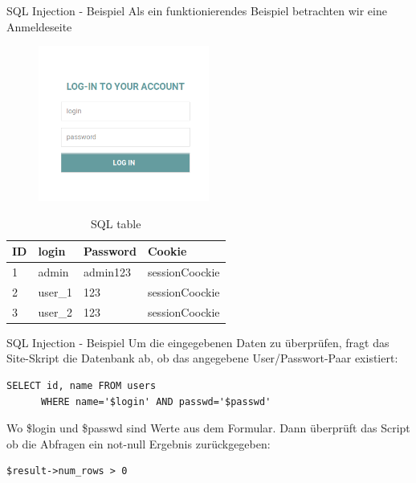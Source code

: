 \documentclass[10pt]{beamer}
\begin{document}
\begin{frame}[fragile]{SQL Injection - Beispiel}
  Als ein funktionierendes Beispiel betrachten wir eine Anmeldeseite
  \newline
  \newline
  \newline
  \begin{minipage}{0.49\textwidth}
    \centering
    \begin{figure}[h]
      \centering
      \includegraphics[width=0.5\textwidth]{sql_ex_1}
    \end{figure}
  \end{minipage}
  \begin{minipage}{0.49\textwidth}
    \centering
    \begin{table}[]
    \scriptsize
    \centering
      \begin{table}[]
        \centering
        \label{my-label}
        \begin{tabular}{| l | l | l | l |}
          \hline
          ID & login & Password & Cookie \\
          \hline
          1 & admin & admin123 & sessionCoockie \\
          2 & user\_1 & 123 & sessionCoockie \\
          3 & user\_2 & 123 & sessionCoockie \\
          \hline
        \end{tabular}
        \footnotesize
        \caption{SQL table}
      \end{table}
    \end{table}
  \end{minipage}
\end{frame}

\begin{frame}[fragile]{SQL Injection - Beispiel}
  Um die eingegebenen Daten zu \"uberpr\"ufen, fragt das Site-Skript die Datenbank ab, ob das angegebene User/Passwort-Paar existiert:
  \newline
  \begin{lstlisting}[style=SQLStyle]
    SELECT id, name FROM users
      WHERE name='$login' AND passwd='$passwd'
  \end{lstlisting}
  Wo \$login und \$passwd sind Werte aus dem Formular.
  \newline
  Dann \"uberpr\"uft das Script ob die Abfragen ein not-null Ergebnis zur\"uckgegeben:
  \newline
  \begin{lstlisting}[style=PHPStyle]
    $result->num_rows > 0
  \end{lstlisting}
\end{frame}
\end{document}
